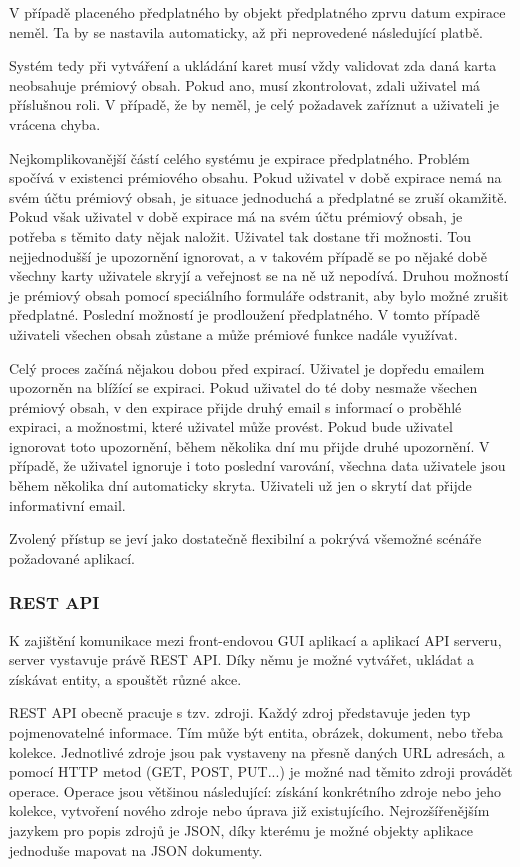 		V případě placeného předplatného by objekt předplatného zprvu datum expirace neměl.
		Ta by se nastavila automaticky, až při neprovedené následující platbě.

		Systém tedy při vytváření a ukládání karet musí vždy validovat zda daná karta neobsahuje prémiový obsah.
		Pokud ano, musí zkontrolovat, zdali uživatel má příslušnou roli.
		V případě, že by neměl, je celý požadavek zaříznut a uživateli je vrácena chyba.

		Nejkomplikovanější částí celého systému je expirace předplatného.
		Problém spočívá v existenci prémiového obsahu.
		Pokud uživatel v době expirace nemá na svém účtu prémiový obsah, je situace jednoduchá a předplatné se zruší okamžitě.
		Pokud však uživatel v době expirace má na svém účtu prémiový obsah, je potřeba s těmito daty nějak naložit.
		Uživatel tak dostane tři možnosti.
		Tou nejjednodušší je upozornění ignorovat, a v takovém případě se po nějaké době všechny karty uživatele skryjí
		a veřejnost se na ně už nepodívá.
		Druhou možností je prémiový obsah pomocí speciálního formuláře odstranit, aby bylo možné zrušit předplatné.
		Poslední možností je prodloužení předplatného.
		V tomto případě uživateli všechen obsah zůstane a může prémiové funkce nadále využívat.

		Celý proces začíná nějakou dobou před expirací.
		Uživatel je dopředu emailem upozorněn na blížící se expiraci.
		Pokud uživatel do té doby nesmaže všechen prémiový obsah, v den expirace přijde druhý email s informací o
		proběhlé expiraci, a možnostmi, které uživatel může provést.
		Pokud bude uživatel ignorovat toto upozornění, během několika dní mu přijde druhé upozornění.
		V případě, že uživatel ignoruje i toto poslední varování, všechna data uživatele jsou během několika dní
		automaticky skryta.
		Uživateli už jen o skrytí dat přijde informativní email.

		Zvolený přístup se jeví jako dostatečně flexibilní a pokrývá všemožné scénáře požadované aplikací.

		\subsubsection{REST API}

		K zajištění komunikace mezi front-endovou \ac{GUI} aplikací a aplikací \ac{API} serveru, server
		vystavuje právě \ac{REST} \ac{API}.
		Díky němu je možné vytvářet, ukládat a získávat entity, a spouštět různé akce.

		\ac{REST} \ac{API} obecně pracuje s tzv. zdroji.
		Každý zdroj představuje jeden typ pojmenovatelné informace.
		Tím může být entita, obrázek, dokument, nebo třeba kolekce.
		Jednotlivé zdroje jsou pak vystaveny na přesně daných \ac{URL} adresách, a pomocí \ac{HTTP} metod (GET, POST, PUT...)
		je možné nad těmito zdroji provádět operace.
		Operace jsou většinou následující: získání konkrétního zdroje nebo jeho kolekce, vytvoření nového zdroje nebo
		úprava již existujícího.
		Nejrozšířenějším jazykem pro popis zdrojů je \ac{JSON}, díky kterému je možné objekty aplikace jednoduše
		mapovat na \ac{JSON} dokumenty. \cite{restfulapi}

